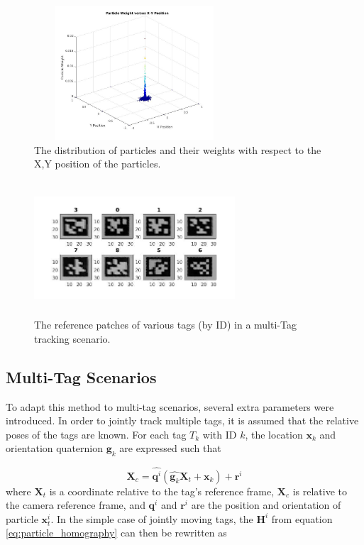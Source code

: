 \documentclass[letterpaper, 10 pt, conference]{ieeeconf}
\renewcommand{\vec}[1]{\boldsymbol{#1}}
\begin{document}
\begin{figure}[b]
	\centering
	\includegraphics[width=7.5cm,height=5cm]{Particles2}
	\caption{The distribution of particles and their weights with respect to the X,Y position of the particles.}
\end{figure}

\begin{figure}[b]
	\centering
	\includegraphics[width=7.5cm,height=5cm]{RefPatches}
	\caption{The reference patches of various tags (by ID) in a multi-Tag tracking scenario.}
\end{figure}

\subsection{Multi-Tag Scenarios}

To adapt this method to multi-tag scenarios, several extra parameters were introduced. In order to jointly track multiple tags, it is assumed that the relative poses of the tags are known. For each tag $T_k$ with ID $k$, the location $\vec{x}_{k}$ and orientation quaternion $\vec{g}_{k}$ are expressed such that

\begin{equation}
	\vec{X}_c = \widehat{\vec{q}^i} (\widehat{\vec{g}_k} \vec{X}_t + \vec{x}_k) + \vec{r}^i
\end{equation}
where $\vec{X}_t$ is a coordinate relative to the tag's reference frame, $\vec{X}_c$ is relative to the camera reference frame, and $\vec{q}^i$ and $\vec{r}^i$ are the position and orientation of particle $\vec{x}^i_t$. In the simple case of jointly moving tags, the $\vec{H}^i$ from equation \ref{eq:particle_homography} can then be rewritten as
\end{document}
